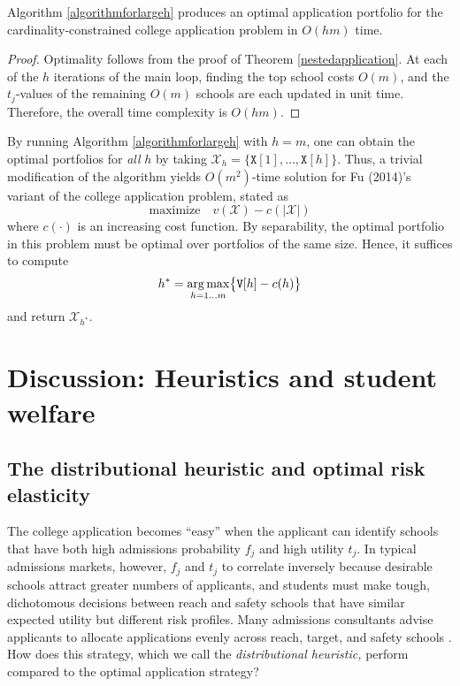 \begin{theorem} \label{validityofalmaalgorithm}
Algorithm \ref{algorithmforlargeh} produces an optimal application portfolio for the cardinality-constrained college application problem in $O(h m)$ time.
\end{theorem}

\begin{proof}
Optimality follows from the proof of Theorem \ref{nestedapplication}. At each of the $h$ iterations of the main loop, finding the top school costs $O(m)$, and the $t_j$-values of the remaining $O(m)$ schools are each updated in unit time. Therefore, the overall time complexity is $O(h m)$.
\end{proof}

By running Algorithm \ref{algorithmforlargeh} with $h = m$, one can obtain the optimal portfolios for \emph{all} $h$ by taking $\mathcal{X}_h = \{ \mathtt{X}[1], \dots, \mathtt{X}[h]\}$. Thus, a trivial modification of the algorithm yields $O(m^2)$-time solution for Fu (2014)'s variant of the college application problem, stated as 
\[ \text{maximize} \quad v(\mathcal{X}) - c(|\mathcal{X}|)\]
where $c(\cdot)$ is an increasing cost function. By separability, the optimal portfolio in this problem must be optimal over portfolios of the same size. Hence, it suffices to compute
\[h^* = \operatorname*{arg\,max}_{h = 1 \dots m} \bigl\{\mathtt{V}[h] - c(h)\bigr\}\] and return $\mathcal{X}_{h^*}$.  






\section{Discussion: Heuristics and student welfare} \label{sectionDiscussion}


\subsection{The distributional heuristic and optimal risk elasticity}

The college application becomes ``easy'' when the applicant can identify schools that have both high admissions probability $f_j$ and high utility $t_j$. In typical admissions markets, however, $f_j$ and $t_j$ to correlate inversely because desirable schools attract greater numbers of applicants, and students must make tough, dichotomous decisions between reach and safety schools that have similar expected utility but different risk profiles. Many admissions consultants advise applicants to allocate applications evenly across reach, target, and safety schools \cite{jeon2015,peck2021}. How does this strategy, which we call the \emph{distributional heuristic,} perform compared to the optimal application strategy?


